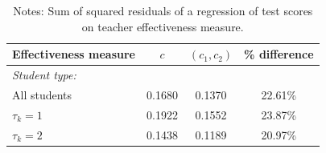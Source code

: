 \documentclass[notitlepage,12pt]{article}%
\begin{document}
\begin{table}[ptb]
\caption{Sum of Squared Test Score Residuals Under $c$ and Under $(c_{1}%
,c_{2})$ }%
\label{sumsquareres}
\begin{center}%
\begin{tabular}
[c]{lccc}\hline\hline
Effectiveness measure & $c$ & $(c_{1},c_{2})$ & \% difference\\\hline
\emph{Student type:} &  &  & \\
All students & 0.1680 & 0.1370 & 22.61\%\\
$\tau_{k}=1$ & 0.1922 & 0.1552 & 23.87\%\\
$\tau_{k}=2$ & 0.1438 & 0.1189 & 20.97\%\\\hline\hline
\end{tabular}
\end{center}
\caption*{{\footnotesize  Notes: Sum of squared residuals of a regression of test scores on teacher effectiveness measure.}}
\end{table}
\end{document}
